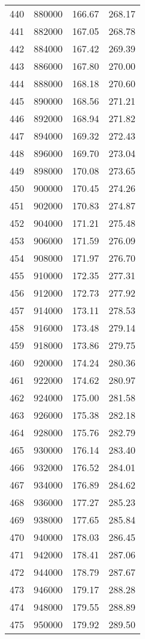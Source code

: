 \documentclass{article}
\begin{document}
\begin{longtable}{@{}l l l l}
440 & 880000 & 166.67 & 268.17\\
441 & 882000 & 167.05 & 268.78\\
442 & 884000 & 167.42 & 269.39\\
443 & 886000 & 167.80 & 270.00\\
444 & 888000 & 168.18 & 270.60\\
445 & 890000 & 168.56 & 271.21\\
446 & 892000 & 168.94 & 271.82\\
447 & 894000 & 169.32 & 272.43\\
448 & 896000 & 169.70 & 273.04\\
449 & 898000 & 170.08 & 273.65\\
450 & 900000 & 170.45 & 274.26\\
451 & 902000 & 170.83 & 274.87\\
452 & 904000 & 171.21 & 275.48\\
453 & 906000 & 171.59 & 276.09\\
454 & 908000 & 171.97 & 276.70\\
455 & 910000 & 172.35 & 277.31\\
456 & 912000 & 172.73 & 277.92\\
457 & 914000 & 173.11 & 278.53\\
458 & 916000 & 173.48 & 279.14\\
459 & 918000 & 173.86 & 279.75\\
460 & 920000 & 174.24 & 280.36\\
461 & 922000 & 174.62 & 280.97\\
462 & 924000 & 175.00 & 281.58\\
463 & 926000 & 175.38 & 282.18\\
464 & 928000 & 175.76 & 282.79\\
465 & 930000 & 176.14 & 283.40\\
466 & 932000 & 176.52 & 284.01\\
467 & 934000 & 176.89 & 284.62\\
468 & 936000 & 177.27 & 285.23\\
469 & 938000 & 177.65 & 285.84\\
470 & 940000 & 178.03 & 286.45\\
471 & 942000 & 178.41 & 287.06\\
472 & 944000 & 178.79 & 287.67\\
473 & 946000 & 179.17 & 288.28\\
474 & 948000 & 179.55 & 288.89\\
475 & 950000 & 179.92 & 289.50\\

\end{longtable}
\end{document}
